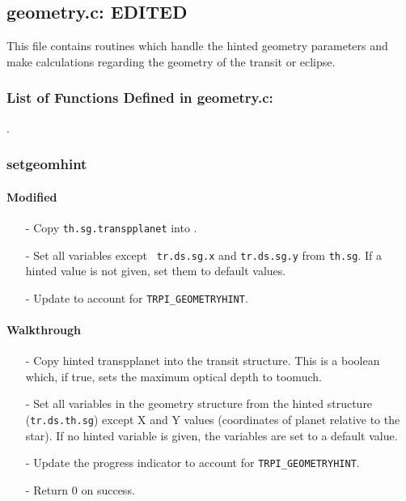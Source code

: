 \documentclass[letterpaper,12pt]{article}
\begin{document}
\newpage
\subsection{geometry.c: EDITED}
This file contains routines which handle the hinted geometry parameters and make calculations regarding the geometry of the transit or eclipse.
\subsubsection{List of Functions Defined in geometry.c:}
 \newline

. \newline

 \newline

\subsubsection{setgeomhint}
\paragraph{Modified}
\begin{enumerate}[leftmargin=10pt, noitemsep, parsep=0pt, topsep=0ex]
\item[-] Copy {\tt th.sg.transpplanet} into .
\item[-] Set all  variables except {\tt
    tr.ds.sg.x} and {\tt tr.ds.sg.y} from {\tt th.sg}. If a hinted value is not given, set them to default values.
\item[-] Update  to account for {\tt TRPI\_GEOMETRYHINT}.
\end{enumerate}

\paragraph{Walkthrough}
\begin{enumerate}[leftmargin=10pt, noitemsep, parsep=0pt, topsep=0ex]
\item[-] Copy hinted transpplanet into the transit structure. This is a boolean which, if true, sets the maximum optical depth to toomuch.
\item[-] Set all variables in the geometry structure from the hinted structure ({\tt tr.ds.th.sg}) except X and Y values (coordinates of planet relative to the star). If no hinted variable is given, the variables are set to a default value.
\item[-] Update the progress indicator to account for {\tt TRPI\_GEOMETRYHINT}.
\item[-] Return 0 on success.
\end{enumerate}
\end{document}
